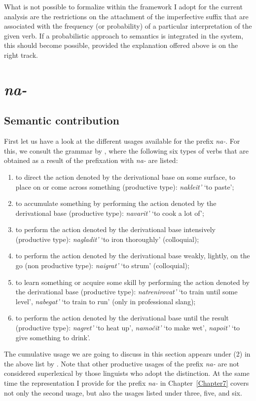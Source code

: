What is not possible to formalize within the framework I adopt for the current analysis are the restrictions on the attachment of the imperfective suffix that are associated with the frequency (or probability) of a particular interpretation of the given verb. If a probabilistic approach to semantics is integrated in the system, this should become possible, provided the explanation offered above is on the right track.

\section{\textit{na-}}\label{subsection:semantics:na}
\subsection{Semantic contribution}
First let us have a look at the different usages available for the prefix \textit{na-}. For this, we consult the grammar by \citet[360]{Shvedova:82}, where the following six types of verbs that are obtained as a result of the prefixation with \textit{na-} are listed:
\begin{enumerate}
\item to direct the action denoted by the derivational base on some surface, to place on or come across something (productive type): \textit{nakleit'} `to paste';
\item to accumulate something by performing the action denoted by the derivational base (productive type): \textit{navarit'} `to cook a lot of';
\item to perform the action denoted by the derivational base intensively (productive type): \textit{nagladit'} `to iron thoroughly' (colloquial);
\item to perform the action denoted by the derivational base weakly, lightly, on the go (non productive type): \textit{naigrat'} `to strum' (colloquial);
\item to learn something or acquire some skill by performing the action denoted by the derivational base (productive type): \textit{natrenirovat'} `to train until some level', \textit{nabegat'} `to train to run' (only in professional slang);
\item to perform the action denoted by the derivational base until the result (productive type): \textit{nagret'} `to heat up', \textit{namo\v{c}it'} `to make wet', \textit{napoit'} `to give something to drink'.
\end{enumerate}

The cumulative usage we are going to discuss in this section appears under (2) in the above list by \citet{Shvedova:82}. Note that other productive usages of the prefix \textit{na-} are not considered superlexical by those linguists who adopt the distinction. At the same time the representation I provide for the prefix \textit{na-} in Chapter~\ref{Chapter7} covers not only the second usage, but also the usages listed under three, five, and six.

